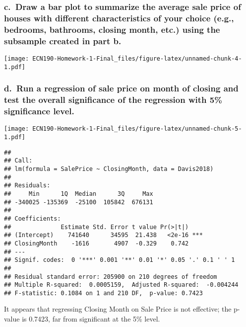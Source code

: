 \documentclass[
]{article}
\begin{document}
\hypertarget{c.-draw-a-bar-plot-to-summarize-the-average-sale-price-of-houses-with-different-characteristics-of-your-choice-e.g.-bedrooms-bathrooms-closing-month-etc.-using-the-subsample-created-in-part-b.}{%
\subsubsection{c.~Draw a bar plot to summarize the average sale price of
houses with different characteristics of your choice (e.g., bedrooms,
bathrooms, closing month, etc.) using the subsample created in part
b.}\label{c.-draw-a-bar-plot-to-summarize-the-average-sale-price-of-houses-with-different-characteristics-of-your-choice-e.g.-bedrooms-bathrooms-closing-month-etc.-using-the-subsample-created-in-part-b.}}

\texttt{[image: ECN190-Homework-1-Final\_files/figure-latex/unnamed-chunk-4-1.pdf]}

\hypertarget{d.-run-a-regression-of-sale-price-on-month-of-closing-and-test-the-overall-significance-of-the-regression-with-5-significance-level.}{%
\subsubsection{d.~Run a regression of sale price on month of closing and
test the overall significance of the regression with 5\% significance
level.}\label{d.-run-a-regression-of-sale-price-on-month-of-closing-and-test-the-overall-significance-of-the-regression-with-5-significance-level.}}

\texttt{[image: ECN190-Homework-1-Final\_files/figure-latex/unnamed-chunk-5-1.pdf]}

\begin{verbatim}
## 
## Call:
## lm(formula = SalePrice ~ ClosingMonth, data = Davis2018)
## 
## Residuals:
##     Min      1Q  Median      3Q     Max 
## -340025 -135369  -25100  105842  676131 
## 
## Coefficients:
##              Estimate Std. Error t value Pr(>|t|)    
## (Intercept)    741640      34595  21.438   <2e-16 ***
## ClosingMonth    -1616       4907  -0.329    0.742    
## ---
## Signif. codes:  0 '***' 0.001 '**' 0.01 '*' 0.05 '.' 0.1 ' ' 1
## 
## Residual standard error: 205900 on 210 degrees of freedom
## Multiple R-squared:  0.0005159,  Adjusted R-squared:  -0.004244 
## F-statistic: 0.1084 on 1 and 210 DF,  p-value: 0.7423
\end{verbatim}

It appears that regressing Closing Month on Sale Price is not effective;
the p-value is 0.7423, far from significant at the 5\% level.
\end{document}
